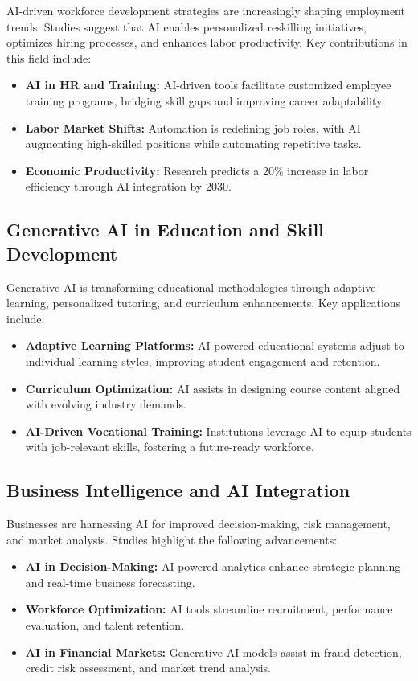 \documentclass[a4paper,headinclude=on,footinclude=on,12pt,oneside]{scrbook}
\begin{document}
AI-driven workforce development strategies are increasingly shaping employment trends. Studies suggest that AI enables personalized reskilling initiatives, optimizes hiring processes, and enhances labor productivity. Key contributions in this field include:
\begin{itemize}
	\item \textbf{AI in HR and Training:} AI-driven tools facilitate customized employee training programs, bridging skill gaps and improving career adaptability.
	\item \textbf{Labor Market Shifts:} Automation is redefining job roles, with AI augmenting high-skilled positions while automating repetitive tasks.
	\item \textbf{Economic Productivity:} Research predicts a 20\% increase in labor efficiency through AI integration by 2030.
\end{itemize}

\subsection*{Generative AI in Education and Skill Development}

Generative AI is transforming educational methodologies through adaptive learning, personalized tutoring, and curriculum enhancements. Key applications include:
\begin{itemize}
	\item \textbf{Adaptive Learning Platforms:} AI-powered educational systems adjust to individual learning styles, improving student engagement and retention.
	\item \textbf{Curriculum Optimization:} AI assists in designing course content aligned with evolving industry demands.
	\item \textbf{AI-Driven Vocational Training:} Institutions leverage AI to equip students with job-relevant skills, fostering a future-ready workforce.
\end{itemize}

\subsection*{Business Intelligence and AI Integration}

Businesses are harnessing AI for improved decision-making, risk management, and market analysis. Studies highlight the following advancements:
\begin{itemize}
	\item \textbf{AI in Decision-Making:} AI-powered analytics enhance strategic planning and real-time business forecasting.
	\item \textbf{Workforce Optimization:} AI tools streamline recruitment, performance evaluation, and talent retention.
	\item \textbf{AI in Financial Markets:} Generative AI models assist in fraud detection, credit risk assessment, and market trend analysis.
\end{itemize}
\end{document}
